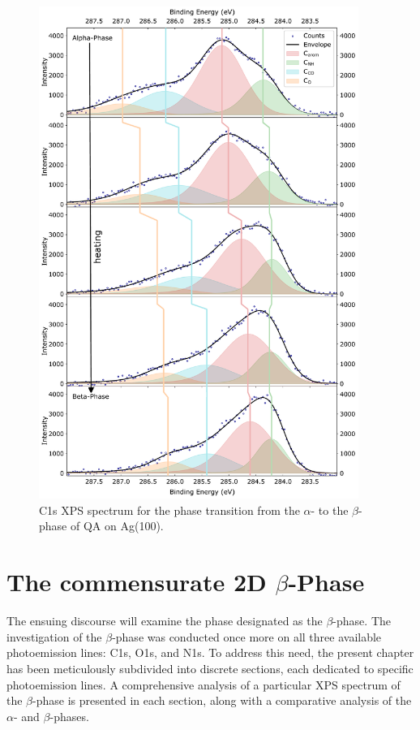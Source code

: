 \begin{figure}[H]
	\centering
	\includegraphics[width=0.93\textwidth]{images/C1s-phase-transition.pdf}
	\caption{C1s \ac{XPS} spectrum for the phase transition from the $\alpha$- to the $\beta$-phase of \ac{QA} on Ag(100).}
	\label{fig:C1s-phase-transition}
\end{figure}

\cleardoublepage
\section{The commensurate 2D \texorpdfstring{$\beta$}{beta}-Phase}
\label{sec:res-beta}

The ensuing discourse will examine the phase designated as the $\beta$-phase. The investigation of the $\beta$-phase was conducted once more on all three available photoemission lines: C1s, O1s, and N1s. To address this need, the present chapter has been meticulously subdivided into discrete sections, each dedicated to specific photoemission lines. A comprehensive analysis of a particular \ac{XPS} spectrum of the $\beta$-phase is presented in each section, along with a comparative analysis of the $\alpha$- and $\beta$-phases.

